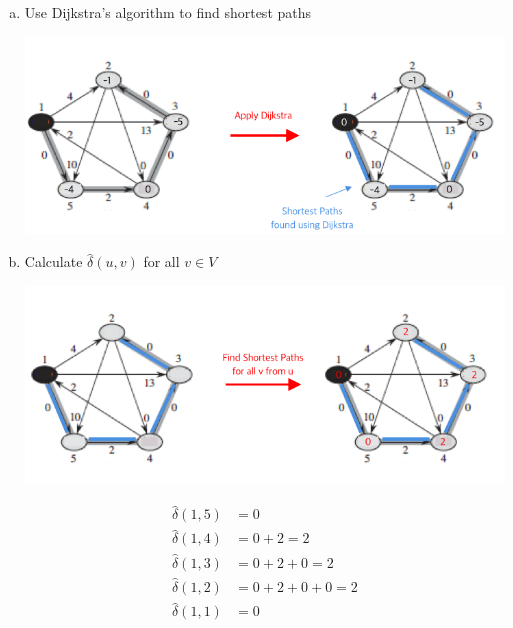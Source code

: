 \documentclass[12pt]{article}
\begin{document}
\begin{enumerate}[1.]
\begin{itemize}
\begin{enumerate}[1.]
            \begin{enumerate}[a)]
                \item Use Dijkstra's algorithm to find shortest paths

                \begin{center}
                \includegraphics[width=\linewidth]{images/worksheet_4_solution_60.png}
                \end{center}

                \item Calculate $\hat{\delta}(u,v)$ for all $v \in V$

                \begin{center}
                \includegraphics[width=\linewidth]{images/worksheet_4_solution_61.png}
                \end{center}

                \bigskip

                \begin{align*}
                    \hat{\delta}(1,5) &= 0\\
                    \hat{\delta}(1,4) &= 0 + 2 = 2\\
                    \hat{\delta}(1,3) &= 0 + 2 + 0 = 2\\
                    \hat{\delta}(1,2) &= 0 + 2 + 0 + 0 = 2\\
                    \hat{\delta}(1,1) &= 0\\
                \end{align*}


\end{enumerate}
\end{enumerate}
\end{itemize}
\end{enumerate}
\end{document}
